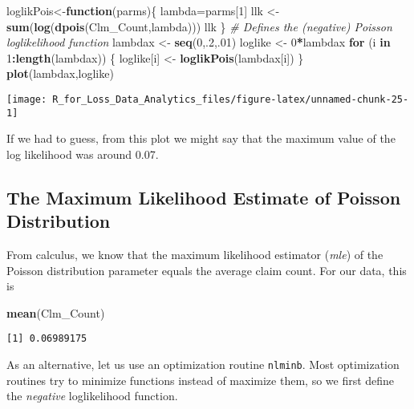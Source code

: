 \documentclass[]{book}
\newenvironment{Shaded}{\begin{snugshade}}{\end{snugshade}}
\newcommand{\KeywordTok}[1]{\textcolor[rgb]{0.13,0.29,0.53}{\textbf{#1}}}
\newcommand{\DecValTok}[1]{\textcolor[rgb]{0.00,0.00,0.81}{#1}}
\newcommand{\StringTok}[1]{\textcolor[rgb]{0.31,0.60,0.02}{#1}}
\newcommand{\CommentTok}[1]{\textcolor[rgb]{0.56,0.35,0.01}{\textit{#1}}}
\newcommand{\ControlFlowTok}[1]{\textcolor[rgb]{0.13,0.29,0.53}{\textbf{#1}}}
\newcommand{\OperatorTok}[1]{\textcolor[rgb]{0.81,0.36,0.00}{\textbf{#1}}}
\newcommand{\NormalTok}[1]{#1}
\theoremstyle{definition}
\theoremstyle{definition}
\theoremstyle{definition}
\theoremstyle{remark}
\begin{document}
\begin{Shaded}
\begin{Highlighting}[]
\NormalTok{loglikPois<-}\ControlFlowTok{function}\NormalTok{(parms)\{ }
\NormalTok{  lambda=parms[}\DecValTok{1}\NormalTok{]}
\NormalTok{  llk <-}\StringTok{ }\KeywordTok{sum}\NormalTok{(}\KeywordTok{log}\NormalTok{(}\KeywordTok{dpois}\NormalTok{(Clm_Count,lambda)))}
\NormalTok{  llk}
\NormalTok{\} }\CommentTok{# Defines the (negative) Poisson loglikelihood function}
\NormalTok{lambdax <-}\StringTok{ }\KeywordTok{seq}\NormalTok{(}\DecValTok{0}\NormalTok{,.}\DecValTok{2}\NormalTok{,.}\DecValTok{01}\NormalTok{)}
\NormalTok{loglike <-}\StringTok{ }\DecValTok{0}\OperatorTok{*}\NormalTok{lambdax}
\ControlFlowTok{for}\NormalTok{ (i }\ControlFlowTok{in} \DecValTok{1}\OperatorTok{:}\KeywordTok{length}\NormalTok{(lambdax)) }
\NormalTok{  \{}
\NormalTok{  loglike[i] <-}\StringTok{ }\KeywordTok{loglikPois}\NormalTok{(lambdax[i])}
\NormalTok{\}}
\KeywordTok{plot}\NormalTok{(lambdax,loglike)}
\end{Highlighting}
\end{Shaded}

\begin{center}\texttt{[image: R\_for\_Loss\_Data\_Analytics\_files/figure-latex/unnamed-chunk-25-1]} \end{center}

If we had to guess, from this plot we might say that the maximum value
of the log likelihood was around 0.07.

\subsection{The Maximum Likelihood Estimate of Poisson
Distribution}\label{the-maximum-likelihood-estimate-of-poisson-distribution}

From calculus, we know that the maximum likelihood estimator
(\emph{mle}) of the Poisson distribution parameter equals the average
claim count. For our data, this is

\begin{Shaded}
\begin{Highlighting}[]
\KeywordTok{mean}\NormalTok{(Clm_Count)}
\end{Highlighting}
\end{Shaded}

\begin{verbatim}
[1] 0.06989175
\end{verbatim}

As an alternative, let us use an optimization routine \texttt{nlminb}.
Most optimization routines try to minimize functions instead of maximize
them, so we first define the \emph{negative} loglikelihood function.
\end{document}
